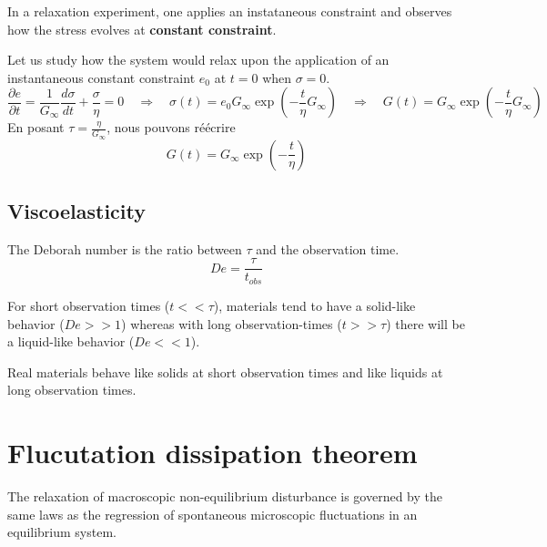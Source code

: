 \documentclass[../phys-f308.tex]{subfiles}
\begin{document}
    In a relaxation experiment, one applies an instataneous constraint and observes how the stress evolves at \textbf{constant constraint}.\\

    \begin{property}
        Let us study how the system would relax upon the application of an instantaneous constant constraint $e_0$ at $t=0$ when $\sigma=0$.
        \begin{equation}
            \frac{\partial e}{\partial t} = \frac{1}{G_\infty}\frac{d\sigma}{dt}+\frac{\sigma}{\eta}=0\quad\Rightarrow\quad\sigma(t)=e_0G_\infty\exp\left(-\frac{t}{\eta}G_\infty\right)\quad\Rightarrow\quad G(t)=G_\infty\exp\left(-\frac{t}{\eta}G_\infty\right)
        \end{equation}
        En posant $\tau = \frac{\eta}{G_\infty}$, nous pouvons réécrire
        \begin{equation}
            G(t) = G_\infty\exp\left(-\frac{t}{\eta}\right)
        \end{equation}
    \end{property}

    \subsection{Viscoelasticity}

    \begin{definition}
        The Deborah number is the ratio between $\tau$ and the observation time.
        \begin{equation}
            De = \frac{\tau}{t_{obs}}
        \end{equation}
    \end{definition}

    For short observation times ($t<<\tau$), materials tend to have a solid-like behavior ($De>>1$) whereas with long observation-times ($t>>\tau$) there will be a liquid-like behavior ($De<<1$).

    \begin{definition}
        Real materials behave like solids at short observation times and like liquids at long observation times.
    \end{definition}

    \section{Flucutation dissipation theorem}

    \begin{definition}
        The relaxation of macroscopic non-equilibrium disturbance is governed by the same laws as the regression of spontaneous microscopic fluctuations in an equilibrium system.
    \end{definition}
\end{document}
